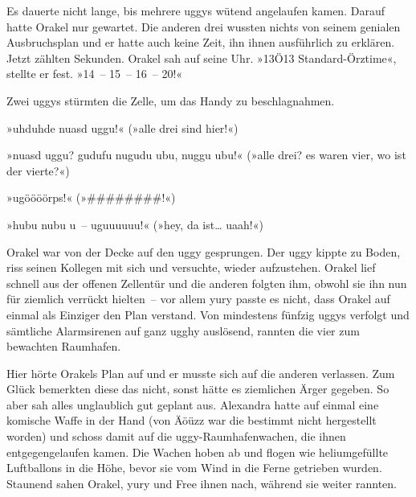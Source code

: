 









Es dauerte nicht lange, bis mehrere uggys wütend angelaufen kamen. Darauf hatte Orakel nur gewartet. Die anderen drei wussten nichts von seinem genialen Ausbruchsplan und er hatte auch keine Zeit, ihn ihnen ausführlich zu erklären. Jetzt zählten Sekunden. Orakel sah auf seine Uhr. »13Ö13 Standard-Örztime«, stellte er fest. »14~– 15~– 16~– 20!«

Zwei uggys stürmten die Zelle, um das Handy zu beschlagnahmen.

»uhduhde nuasd uggu!« (»alle drei sind hier!«)

»nuasd uggu? gudufu nugudu ubu, nuggu ubu!« (»alle drei? es waren vier, wo ist der vierte?«)

»ugöööörps!« (»\#\#\#\#\#\#\#\#!«)

»hubu nubu u~– uguuuuuu!« (»hey, da ist… uaah!«)

Orakel war von der Decke auf den uggy gesprungen. Der uggy kippte zu Boden, riss seinen Kollegen mit sich und versuchte, wieder aufzustehen. Orakel lief schnell aus der offenen Zellentür und die anderen folgten ihm, obwohl sie ihn nun für ziemlich verrückt hielten~– vor allem yury passte es nicht, dass Orakel auf einmal als Einziger den Plan verstand. Von mindestens fünfzig uggys verfolgt und sämtliche Alarmsirenen auf ganz ugghy auslösend, rannten die vier zum bewachten Raumhafen.

Hier hörte Orakels Plan auf und er musste sich auf die anderen verlassen. Zum Glück bemerkten diese das nicht, sonst hätte es ziemlichen Ärger gegeben. So aber sah alles unglaublich gut geplant aus. Alexandra hatte auf einmal eine komische Waffe in der Hand (von Äöüzz war die bestimmt nicht hergestellt worden) und schoss damit auf die uggy-Raumhafenwachen, die ihnen entgegengelaufen kamen. Die Wachen hoben ab und flogen wie heliumgefüllte Luftballons in die Höhe, bevor sie vom Wind in die Ferne getrieben wurden. Staunend sahen Orakel, yury und Free ihnen nach, während sie weiter rannten.

